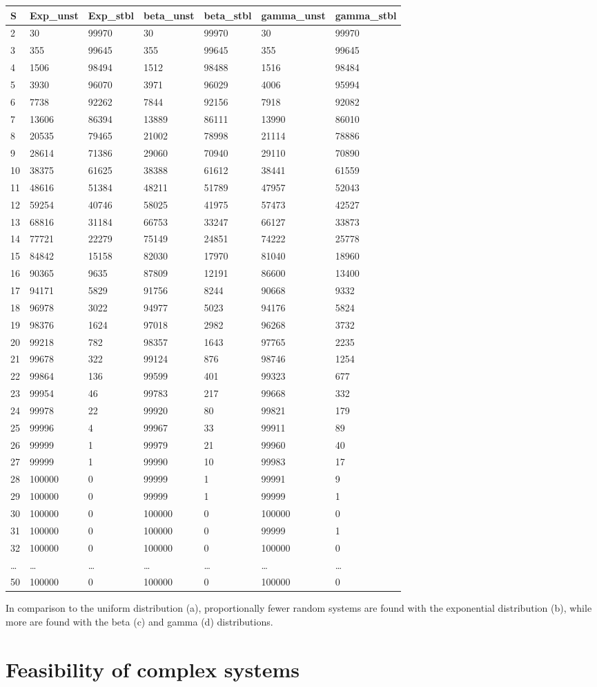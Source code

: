 \documentclass[]{article}
\begin{document}
\begin{longtable}[]{@{}lllllll@{}}
\toprule
S & Exp\_unst & Exp\_stbl & beta\_unst & beta\_stbl & gamma\_unst &
gamma\_stbl\tabularnewline
\midrule
\endhead
2 & 30 & 99970 & 30 & 99970 & 30 & 99970\tabularnewline
3 & 355 & 99645 & 355 & 99645 & 355 & 99645\tabularnewline
4 & 1506 & 98494 & 1512 & 98488 & 1516 & 98484\tabularnewline
5 & 3930 & 96070 & 3971 & 96029 & 4006 & 95994\tabularnewline
6 & 7738 & 92262 & 7844 & 92156 & 7918 & 92082\tabularnewline
7 & 13606 & 86394 & 13889 & 86111 & 13990 & 86010\tabularnewline
8 & 20535 & 79465 & 21002 & 78998 & 21114 & 78886\tabularnewline
9 & 28614 & 71386 & 29060 & 70940 & 29110 & 70890\tabularnewline
10 & 38375 & 61625 & 38388 & 61612 & 38441 & 61559\tabularnewline
11 & 48616 & 51384 & 48211 & 51789 & 47957 & 52043\tabularnewline
12 & 59254 & 40746 & 58025 & 41975 & 57473 & 42527\tabularnewline
13 & 68816 & 31184 & 66753 & 33247 & 66127 & 33873\tabularnewline
14 & 77721 & 22279 & 75149 & 24851 & 74222 & 25778\tabularnewline
15 & 84842 & 15158 & 82030 & 17970 & 81040 & 18960\tabularnewline
16 & 90365 & 9635 & 87809 & 12191 & 86600 & 13400\tabularnewline
17 & 94171 & 5829 & 91756 & 8244 & 90668 & 9332\tabularnewline
18 & 96978 & 3022 & 94977 & 5023 & 94176 & 5824\tabularnewline
19 & 98376 & 1624 & 97018 & 2982 & 96268 & 3732\tabularnewline
20 & 99218 & 782 & 98357 & 1643 & 97765 & 2235\tabularnewline
21 & 99678 & 322 & 99124 & 876 & 98746 & 1254\tabularnewline
22 & 99864 & 136 & 99599 & 401 & 99323 & 677\tabularnewline
23 & 99954 & 46 & 99783 & 217 & 99668 & 332\tabularnewline
24 & 99978 & 22 & 99920 & 80 & 99821 & 179\tabularnewline
25 & 99996 & 4 & 99967 & 33 & 99911 & 89\tabularnewline
26 & 99999 & 1 & 99979 & 21 & 99960 & 40\tabularnewline
27 & 99999 & 1 & 99990 & 10 & 99983 & 17\tabularnewline
28 & 100000 & 0 & 99999 & 1 & 99991 & 9\tabularnewline
29 & 100000 & 0 & 99999 & 1 & 99999 & 1\tabularnewline
30 & 100000 & 0 & 100000 & 0 & 100000 & 0\tabularnewline
31 & 100000 & 0 & 100000 & 0 & 99999 & 1\tabularnewline
32 & 100000 & 0 & 100000 & 0 & 100000 & 0\tabularnewline
\ldots{} & \ldots{} & \ldots{} & \ldots{} & \ldots{} & \ldots{} &
\ldots{}\tabularnewline
50 & 100000 & 0 & 100000 & 0 & 100000 & 0\tabularnewline
\bottomrule
\end{longtable}

In comparison to the uniform distribution (a), proportionally fewer
random systems are found with the exponential distribution (b), while
more are found with the beta (c) and gamma (d) distributions.

\hypertarget{Feasibility}{\section{Feasibility of complex
systems}\label{Feasibility}}
\end{document}
